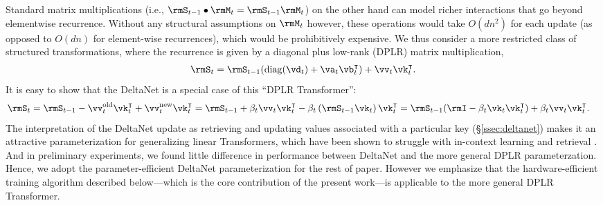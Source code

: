 Standard matrix multiplications (i.e., $\rmS_{t-1}\bullet \rmM_t = \rmS_{t-1}\rmM_t$) on the other hand can model richer  interactions  that go beyond elementwise recurrence. Without any structural assumptions on $\rmM_t$ however, these operations would take $O(dn^2)$  for each update (as opposed to $O(dn)$ for element-wise recurrences),  which would be prohibitively expensive. We thus consider a more restricted class of structured transformations, where the recurrence  is given by a diagonal plus low-rank (DPLR) matrix multiplication,
\begin{align*}
    \rmS_{t} = \rmS_{t-1}(\operatorname{diag}(\vd_t) + \va_t \vb_t^\intercal ) + \vv_t \vk_t^\intercal.
\end{align*}
It is easy to show that the DeltaNet is a special case of this ``DPLR Transformer'':
\begin{align*}
    \rmS_t &= \rmS_{t-1} -\vv_t^{\text{old}}\vk_t^\intercal+\vv_t^{\text{new} }\vk_t^\intercal\nonumber  =  \rmS_{t-1} + \beta_t \vv_t \vk_t^\intercal - \beta_t \left(\rmS_{t-1} \vk_t\right)\vk_t^\intercal = \rmS_{t-1} (\rmI - \beta_t \vk_t \vk_t^\intercal) + \beta_t \vv_t  \vk_t^\intercal.
\end{align*}
The interpretation of the DeltaNet update as retrieving and updating values associated with a particular key (\S\ref{ssec:deltanet}) makes it an attractive parameterization for generalizing linear Transformers, which have been shown to struggle with in-context learning and retrieval \cite{}. And in preliminary experiments, we found little difference in performance between DeltaNet and the more general DPLR parameterzation. Hence, we adopt the  parameter-efficient DeltaNet parameterization for the rest of paper. However we emphasize that the hardware-efficient training algorithm described below---which is the core contribution of the present work---is applicable to the more general DPLR Transformer.



